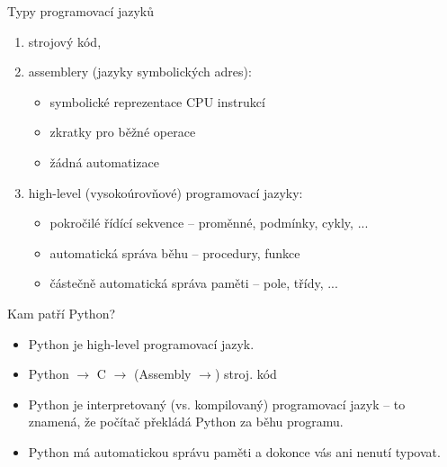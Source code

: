 \begin{frame}{Typy programovací jazyků}
 \begin{enumerate}[label=(\arabic*)]
  \item<1-> strojový kód,
  \item<2-> assemblery (jazyky symbolických adres):
   \begin{itemize}
    \item symbolické reprezentace CPU instrukcí
    \item zkratky pro běžné operace
    \item žádná automatizace
   \end{itemize}
  \item<3-> high-level (vysokoúrovňové) programovací jazyky:
   \begin{itemize}
    \item pokročilé řídící sekvence -- proměnné, podmínky, cykly, ...
    \item automatická správa běhu -- procedury, funkce
    \item částečně automatická správa paměti -- pole, třídy, ...
   \end{itemize}
 \end{enumerate}
\end{frame}

\begin{frame}{Kam patří Python?}
 \begin{itemize}
  \item<1-> Python je high-level programovací jazyk.
  \item<2-> Python $\rightarrow$ C $\rightarrow$ (Assembly $\rightarrow$) stroj.
   kód 
  \item<3-> Python je \alert{interpretovaný} (vs. kompilovaný) programovací
   jazyk -- to znamená, že počítač překládá Python za běhu programu.
  \item<4-> Python má automatickou správu paměti a dokonce vás ani nenutí
   typovat.
 \end{itemize}
\end{frame}
